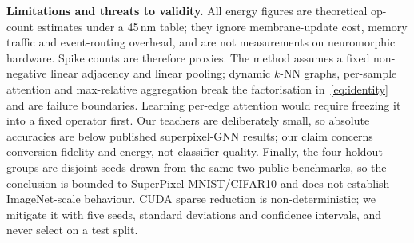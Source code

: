 \textbf{Limitations and threats to validity.} All energy figures are theoretical op-count estimates under a 45\,nm table; they ignore membrane-update cost, memory traffic and event-routing overhead, and are not measurements on neuromorphic hardware. Spike counts are therefore proxies. The method assumes a fixed non-negative linear adjacency and linear pooling; dynamic $k$-NN graphs, per-sample attention and max-relative aggregation break the factorisation in~\eqref{eq:identity} and are failure boundaries. Learning per-edge attention would require freezing it into a fixed operator first. Our teachers are deliberately small, so absolute accuracies are below published superpixel-GNN results; our claim concerns conversion fidelity and energy, not classifier quality. Finally, the four holdout groups are disjoint seeds drawn from the same two public benchmarks, so the conclusion is bounded to SuperPixel MNIST/CIFAR10 and does not establish ImageNet-scale behaviour. CUDA sparse reduction is non-deterministic; we mitigate it with five seeds, standard deviations and confidence intervals, and never select on a test split.
